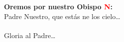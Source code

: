 \textbf{Oremos por nuestro Obispo \textcolor{red}{N}:}\\
Padre Nuestro, que estás ne los cielo\ldots\\
\\
Gloria al Padre\ldots